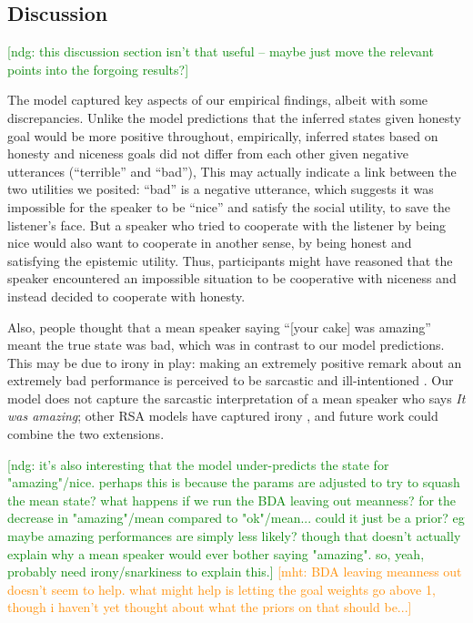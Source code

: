 \documentclass[10pt,letterpaper]{article}
\newcommand{\ndg}[1]{\textcolor{Green}{[ndg: #1]}}
\newcommand{\mht}[1]{\textcolor{DarkOrange}{[mht: #1]}}
\begin{document}
\subsection{Discussion}

\ndg{this discussion section isn't that useful -- maybe just move the relevant points into the forgoing results?}

The model captured key aspects of our empirical findings, albeit with some discrepancies.
Unlike the model predictions that the inferred states given honesty goal would be more positive throughout,
empirically, inferred states based on honesty and niceness goals did not differ from each other given negative utterances (``terrible'' and ``bad''), 
This may actually indicate a link between the two utilities we posited: 
``bad'' is a negative utterance, which suggests it was impossible for the speaker to be ``nice'' and satisfy the social utility, to save the listener's face. 
But a speaker who tried to cooperate with the listener by being nice would also want to cooperate in another sense, by being honest and satisfying the epistemic utility.  
Thus, participants might have reasoned that the speaker encountered an impossible situation to be cooperative with niceness and instead decided to cooperate with honesty. 

Also, people thought that a mean speaker saying ``[your cake] was amazing'' meant the true state was bad, which was in contrast to our model predictions. 
This may be due to irony in play: making an extremely positive remark about an extremely bad performance is perceived to be sarcastic and ill-intentioned \cite{colston1997}. 
Our model does not capture the sarcastic interpretation of a mean speaker who says \emph{It was amazing}; 
other RSA models have captured irony \cite{Kao2015}, and future work could combine the two extensions.

\ndg{it's also interesting that the model under-predicts the state for "amazing"/nice. perhaps this is because the params are adjusted to try to squash the mean state? what happens if we run the BDA leaving out meanness?
for the decrease in "amazing"/mean compared to "ok"/mean... could it just be a prior? eg maybe amazing performances are simply less likely? though that doesn't actually explain why a mean speaker would ever bother saying "amazing". so, yeah, probably need irony/snarkiness to explain this.}
\mht{BDA leaving meanness out doesn't seem to help. what might help is letting the goal weights go above 1, though i haven't yet thought about what the priors on that should be...}
\end{document}
